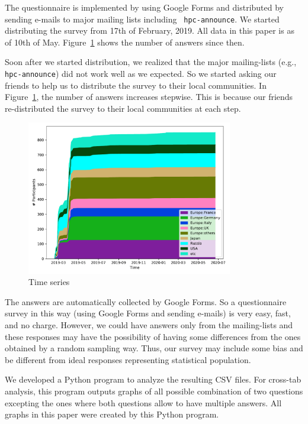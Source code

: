 \documentclass[submit,techrep,noauthor,english]{ipsj}
\begin{document}
The questionnaire is implemented by using Google Forms and distributed
by sending e-mails to major mailing lists including {\tt
  hpc-announce}. We started distributing the survey from 17th of
February, 2019. All data in this paper is as of 10th of
May. Figure~\ref{fig:timeseries} shows the number of answers since then.

Soon after we started distribution, we realized that the major
mailing-lists (e.g., {\tt hpc-announce}) did not work well as we
expected. So we started asking our friends to help us to distribute
the survey to their local communities. In Figure~\ref{fig:timeseries},
the number of answers increases stepwise. This is because our friends
re-distributed the survey to their local communities at each step. 

\begin{figure}[htb]
\begin{center}
\includegraphics[width=9cm]{../pdfs/TimeSeries.pdf}
\caption{Time series}
\label{fig:timeseries}
\end{center}
\end{figure}

The answers are automatically collected by Google Forms. So a
questionnaire survey in this way (using Google Forms and sending
e-mails) is very easy, fast, and no charge.  However, we could have 
answers only from the mailing-lists and these responses may have the
possibility of having some differences from the ones obtained by a
random sampling way. Thus, our survey may include some bias and be
different from ideal responses representing statistical population.  

We developed a Python program to analyze the resulting CSV files. For
cross-tab analysis, this program outputs graphs of all possible
combination of two questions excepting the ones where both questions
allow to have multiple answers. All graphs in this paper were created
by this Python program. 
\end{document}
